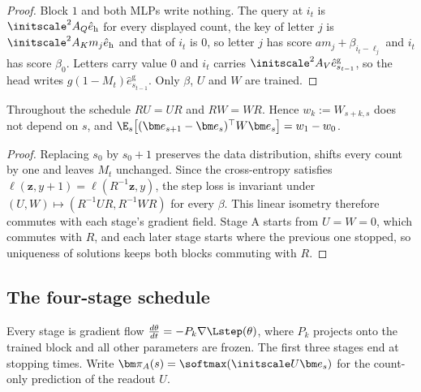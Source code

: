 \begin{proof}
Block $1$ and both MLPs write nothing. The query at $i_t$ is $\initscale^2A_Q\hat e_{\mathrm h}$ for every displayed count, the key of
letter $j$ is $\initscale^2A_Km_j\hat e_{\mathrm h}$ and that of $i_t$ is $0$, so letter $j$ has score $am_j+\beta_{i_t-\ell_j}$ and $i_t$ has
score $\beta_0$. Letters carry value $0$ and $i_t$ carries $\initscale^2A_V\hat e^{\mathrm g}_{s_{t-1}}$, so the head writes
$g(1-M_t)\hat e^{\mathrm g}_{s_{t-1}}$. Only $\beta$, $U$ and $W$ are trained.
\end{proof}

\begin{lemma}
\label{lem:R-symmetry}
Throughout the schedule $RU=UR$ and $RW=WR$. Hence $w_k:=W_{s+k,s}$ does not depend on $s$, and
$\E_s\bigl[(\bm e_{s+1}-\bm e_s)^\top W\bm e_s\bigr]=w_1-w_0$.
\end{lemma}

\begin{proof}
Replacing $s_0$ by $s_0+1$ preserves the data distribution, shifts every count by one and leaves $M_t$ unchanged. Since the
cross-entropy satisfies $\ell(\bm z,y+1)=\ell(R^{-1}\bm z,y)$, the step loss is invariant under
$(U,W)\mapsto(R^{-1}UR,R^{-1}WR)$ for every $\beta$. This linear isometry therefore commutes with each stage's gradient field. Stage A
starts from $U=W=0$, which commutes with $R$, and each later stage starts where the previous one stopped, so uniqueness of solutions
keeps both blocks commuting with $R$.
\end{proof}

\subsection{The four-stage schedule}
Every stage is gradient flow $\tfrac{d\theta}{dt}=-P_k\nabla\Lstep(\theta)$, where $P_k$ projects onto the
trained block and all other parameters are frozen. The first three stages end at stopping times.
Write $\bm\pi_A(s)=\softmax(\initscale U\bm e_s)$ for the count-only prediction of the readout $U$.

